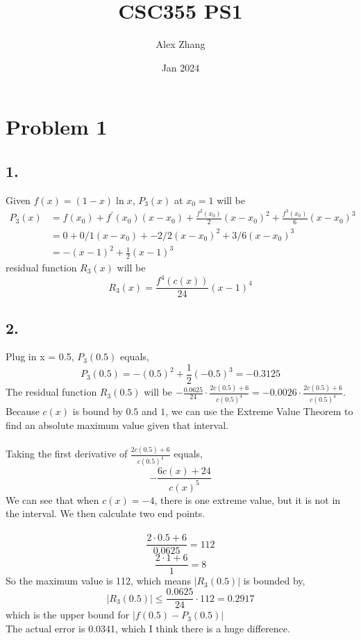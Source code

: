 \documentclass{article}
\title{CSC355 PS1}
\author{Alex Zhang}
\date{Jan 2024}
\begin{document}
\maketitle

\section{Problem 1}
\subsection*{1.}
Given $f(x) = (1-x) \ln x$, $P_3(x)$ at $x_0 = 1$ will be
\begin{align}
    P_3(x) &= f(x_0) + f^\prime (x_0)(x-x_0) + \frac{f^2(x_0)}{2}(x-x_0)^2 + \frac{f^3(x_0)}{6}(x-x_0)^3 \nonumber \\
    &= 0 + 0/1(x-x_0) + -2/2(x-x_0)^2 + 3/6(x-x_0)^3 \nonumber \\ 
    &= -(x-1)^2 + \frac{1}{2}(x-1)^3 \nonumber
\end{align}
residual function $R_3(x)$ will be 
$$R_3(x) = \frac{f^4(c(x))}{24}(x-1)^4$$


\subsection*{2.}
Plug in x = 0.5, $P_3(0.5)$ equals,
$$P_3(0.5) = -(0.5)^2 + \frac{1}{2}(-0.5)^3 = - 0.3125$$
The residual function $R_3(0.5)$ will be $-\frac{0.0625}{24} \cdot \frac{2c(0.5) + 6}{c(0.5)^4} = -0.0026 \cdot \frac{2c(0.5) + 6}{c(0.5)^4}$.
Because $c(x)$ is bound by $0.5$ and $1$, we can use the Extreme Value Theorem to find an absolute maximum value given that interval.
\\
\\
Taking the first derivative of $\frac{2c(0.5) + 6}{c(0.5)^4}$ equals,
$$-\frac{6c(x)+24}{c(x)^5}$$
We can see that when $c(x) = -4$, there is one extreme value, but it is not in the interval.
We then calculate two end points.
\\
\\
$$\frac{2\cdot 0.5 + 6}{0.0625} = 112$$
$$\frac{2\cdot 1 + 6}{1} = 8$$
So the maximum value is 112, which means $|R_3(0.5)|$ is bounded by,
$$|R_3(0.5)| \leq \frac{0.0625}{24} \cdot 112 = 0.2917$$
which is the upper bound for $|f(0.5) - P_3(0.5)|$
\\
The actual error is 0.0341, which I think there is a huge difference.
\end{document}
